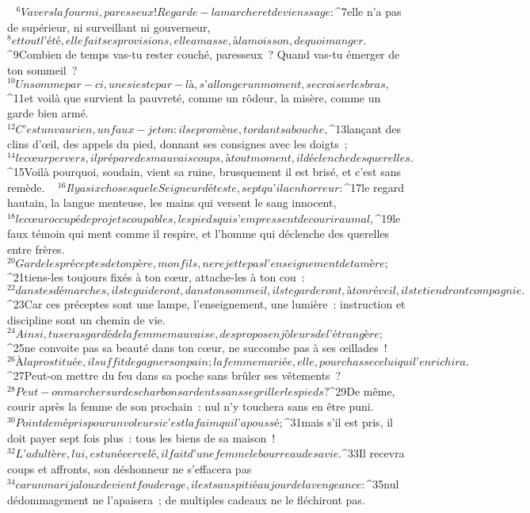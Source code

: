            
${}^{6}Va vers la fourmi, paresseux !
        Regarde-la marcher et deviens sage :
${}^{7}elle n’a pas de supérieur,
        ni surveillant ni gouverneur,
${}^{8}et tout l’été, elle fait ses provisions,
        elle amasse, à la moisson, de quoi manger.
${}^{9}Combien de temps vas-tu rester couché, paresseux ?
        Quand vas-tu émerger de ton sommeil ?
${}^{10}Un somme par-ci, une sieste par-là,
        s’allonger un moment, se croiser les bras,
${}^{11}et voilà que survient la pauvreté, comme un rôdeur,
        la misère, comme un garde bien armé.
${}^{12}C’est un vaurien, un faux-jeton :
        il se promène, tordant sa bouche,
${}^{13}lançant des clins d’œil, des appels du pied,
        donnant ses consignes avec les doigts ;
${}^{14}le cœur pervers, il prépare des mauvais coups,
        à tout moment, il déclenche des querelles.
${}^{15}Voilà pourquoi, soudain, vient sa ruine,
        brusquement il est brisé,
        et c’est sans remède.
         
${}^{16}Il y a six choses que le Seigneur déteste,
        sept qu’il a en horreur :
${}^{17}le regard hautain, la langue menteuse,
        les mains qui versent le sang innocent,
${}^{18}le cœur occupé de projets coupables,
        les pieds qui s’empressent de courir au mal,
${}^{19}le faux témoin qui ment comme il respire,
        et l’homme qui déclenche des querelles entre frères.
${}^{20}Garde les préceptes de ton père, mon fils,
        ne rejette pas l’enseignement de ta mère ;
${}^{21}tiens-les toujours fixés à ton cœur,
        attache-les à ton cou :
${}^{22}dans tes démarches, ils te guideront,
        dans ton sommeil, ils te garderont,
        à ton réveil, ils te tiendront compagnie.
${}^{23}Car ces préceptes sont une lampe,
        l’enseignement, une lumière :
        instruction et discipline sont un chemin de vie.
${}^{24}Ainsi, tu seras gardé de la femme mauvaise,
        des propos enjôleurs de l’étrangère ;
${}^{25}ne convoite pas sa beauté dans ton cœur,
        ne succombe pas à ses œillades !
${}^{26}À la prostituée, il suffit de gagner son pain ;
        la femme mariée, elle, pourchasse celui qui l’enrichira.
${}^{27}Peut-on mettre du feu dans sa poche
        sans brûler ses vêtements ?
${}^{28}Peut-on marcher sur des charbons ardents
        sans se griller les pieds ?
${}^{29}De même, courir après la femme de son prochain :
        nul n’y touchera sans en être puni.
${}^{30}Point de mépris pour un voleur
        si c’est la faim qui l’a poussé ;
${}^{31}mais s’il est pris, il doit payer sept fois plus :
        tous les biens de sa maison !
${}^{32}L’adultère, lui, est un écervelé,
        il fait d’une femme le bourreau de sa vie.
${}^{33}Il recevra coups et affronts,
        son déshonneur ne s’effacera pas
${}^{34}car un mari jaloux devient fou de rage,
        il est sans pitié au jour de la vengeance :
${}^{35}nul dédommagement ne l’apaisera ;
        de multiples cadeaux ne le fléchiront pas.
       
      
